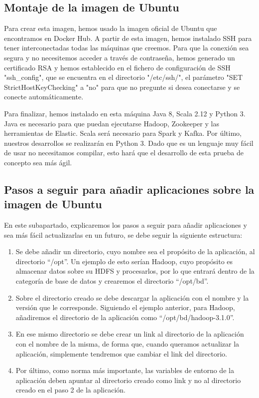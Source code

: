 \subsection{Montaje de la imagen de Ubuntu\label{montUbuntu}}

Para crear esta imagen, hemos usado la imagen oficial de Ubuntu que encontramos en Docker Hub. A partir de esta imagen, hemos instalado SSH para tener interconectadas todas las máquinas que creemos. Para que la conexión sea segura y no necesitemos acceder a través de contraseña, hemos generado un certificado RSA y hemos establecido en el fichero de configuración de SSH "ssh\_config", que se encuentra en el directorio "/etc/ssh/", el parámetro  "SET StrictHostKeyChecking" a  "no" para que no pregunte si desea conectarse y se conecte automáticamente.

Para finalizar, hemos instalado en esta máquina Java 8, Scala 2.12 y Python 3. Java es necesario para que puedan ejecutarse Hadoop, Zookeeper y las herramientas de Elastic. Scala será necesario para Spark y Kafka. Por último, nuestros desarrollos se realizarán en Python 3. Dado que es un lenguaje muy fácil de usar no necesitamos compilar, esto hará que el desarrollo de esta prueba de concepto sea más ágil.

\subsection{Pasos a seguir para añadir aplicaciones sobre la imagen de Ubuntu\label{pasosUbuntu}}

En este subapartado, explicaremos los pasos a seguir para añadir aplicaciones y sea más fácil actualizarlas en un futuro, se debe seguir la siguiente estructura:

\begin{enumerate}

\item Se debe añadir un directorio, cuyo nombre sea el propósito de la aplicación, al directorio “/opt”. Un ejemplo de esto serían Hadoop, cuyo propósito es almacenar datos sobre su HDFS y procesarlos, por lo que entrará dentro de la categoría de base de datos y crearemos el directorio “/opt/bd”.

\item Sobre el directorio creado se debe descargar la aplicación con el nombre y la versión que le corresponde. Siguiendo el ejemplo anterior, para Hadoop, añadiremos el directorio de la aplicación como “/opt/bd/hadoop-3.1.0”.

\item En ese mismo directorio se debe crear un link al directorio de la aplicación con el nombre de la misma, de forma que, cuando queramos actualizar la aplicación, simplemente tendremos que cambiar el link del directorio.

\item Por último, como norma más importante, las variables de entorno de la aplicación deben apuntar al directorio creado como link y no al directorio creado en el paso 2 de la aplicación.

\end{enumerate}


